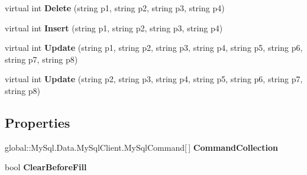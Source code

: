 \begin{DoxyCompactItemize}
\item 
virtual int {\bfseries Delete} (string p1, string p2, string p3, string p4)\hypertarget{class_products_1_1_data_1_1ds_sage_table_adapters_1_1ta_maschinenmodell_a36081b5ddf1ddeb84a497795d97114af}{}\label{class_products_1_1_data_1_1ds_sage_table_adapters_1_1ta_maschinenmodell_a36081b5ddf1ddeb84a497795d97114af}

\item 
virtual int {\bfseries Insert} (string p1, string p2, string p3, string p4)\hypertarget{class_products_1_1_data_1_1ds_sage_table_adapters_1_1ta_maschinenmodell_abfa7c9ff757265a79ef2c6e7471124aa}{}\label{class_products_1_1_data_1_1ds_sage_table_adapters_1_1ta_maschinenmodell_abfa7c9ff757265a79ef2c6e7471124aa}

\item 
virtual int {\bfseries Update} (string p1, string p2, string p3, string p4, string p5, string p6, string p7, string p8)\hypertarget{class_products_1_1_data_1_1ds_sage_table_adapters_1_1ta_maschinenmodell_aeaa40a0367f559dc822b6c1327425875}{}\label{class_products_1_1_data_1_1ds_sage_table_adapters_1_1ta_maschinenmodell_aeaa40a0367f559dc822b6c1327425875}

\item 
virtual int {\bfseries Update} (string p2, string p3, string p4, string p5, string p6, string p7, string p8)\hypertarget{class_products_1_1_data_1_1ds_sage_table_adapters_1_1ta_maschinenmodell_a51f59ff1bc5c309e17bdcc5a966cd208}{}\label{class_products_1_1_data_1_1ds_sage_table_adapters_1_1ta_maschinenmodell_a51f59ff1bc5c309e17bdcc5a966cd208}

\end{DoxyCompactItemize}
\subsection*{Properties}
\begin{DoxyCompactItemize}
\item 
global\+::\+My\+Sql.\+Data.\+My\+Sql\+Client.\+My\+Sql\+Command\mbox{[}$\,$\mbox{]} {\bfseries Command\+Collection}\hypertarget{class_products_1_1_data_1_1ds_sage_table_adapters_1_1ta_maschinenmodell_a008297b42ea20331ce393b02b22f8b0a}{}\label{class_products_1_1_data_1_1ds_sage_table_adapters_1_1ta_maschinenmodell_a008297b42ea20331ce393b02b22f8b0a}

\item 
bool {\bfseries Clear\+Before\+Fill}\hypertarget{class_products_1_1_data_1_1ds_sage_table_adapters_1_1ta_maschinenmodell_a2c056dcc0dabb4df73b2708e49696a38}{}\label{class_products_1_1_data_1_1ds_sage_table_adapters_1_1ta_maschinenmodell_a2c056dcc0dabb4df73b2708e49696a38}

\end{DoxyCompactItemize}


